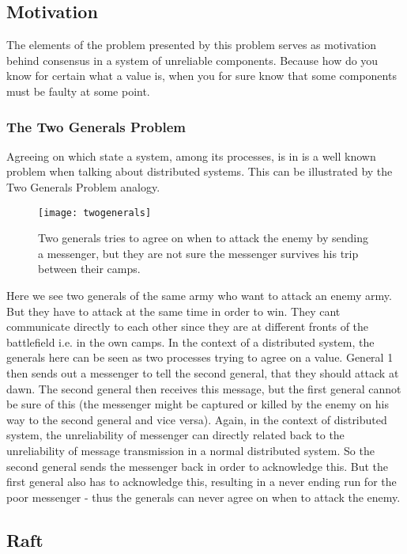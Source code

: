 \subsection{Motivation}
The elements of the problem presented by this problem serves as motivation behind consensus in a system of unreliable components. Because how do you know for certain what a value is, when you for sure know that some components must be faulty at some point.
\subsubsection{The Two Generals Problem}
Agreeing on which state a system, among its processes, is in is a well known problem when talking about distributed systems.
This can be illustrated by the Two Generals Problem analogy.
\begin{figure}[h]
	\centering
	\texttt{[image: twogenerals]}
	\caption{Two generals tries to agree on when to attack the enemy by sending a messenger, but they are not sure the messenger survives his trip between their camps.}
	\label{generals}
\end{figure}
Here we see two generals of the same army who want to attack an enemy army. But they have to attack at the same time in order to win. They cant communicate directly to each other since they are at different fronts of the battlefield i.e. in the own camps. In the context of a distributed system, the generals here can be seen as two processes trying to agree on a value.
General 1 then sends out a messenger to tell the second general, that they should attack at dawn. The second general then receives this message, but the first general cannot be sure of this (the messenger might be captured or killed by the 
enemy on his way to the second general and vice versa). Again, in the context of distributed system, the unreliability of messenger can directly related back to the unreliability of message transmission in a normal distributed system.
So the second general sends the messenger back in order to acknowledge this. But the first general also has to acknowledge this, resulting in a never ending run for the poor messenger - thus the generals can never agree on when to attack the enemy.
\subsection{Raft}